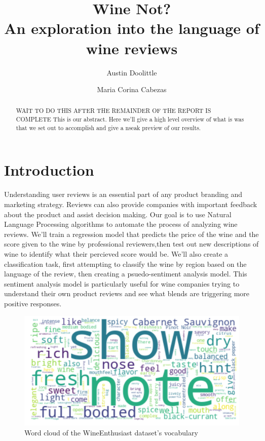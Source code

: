\documentclass[10pt]{IEEEtran}
\title{
    Wine Not? \\
    \large An exploration into the language of wine reviews
}
\author[1]{Austin Doolittle}
\author[1]{Maria Corina Cabezas}
\affil[1]{
    University of California, Berkeley
    \authorcr{\tt \{austin.doolittle, m.cabezas95\}@berkeley.edu}\vspace{1.5ex}
}
\begin{document}
\maketitle
\begin{abstract}
    WAIT TO DO THIS AFTER THE REMAINDER OF THE REPORT IS COMPLETE
    This is our abstract. Here we'll give a high level overview of what is was that we set out to accomplish and give a nseak preview of our results.
\end{abstract}

\section{Introduction}
    Understanding user reviews is an essential part of any product branding and marketing strategy. Reviews can also provide companies with important feedback about the product and assist decision making. Our goal is to use Natural Language Processing algorithms to automate the process of analyzing wine reviews. We'll train a regression model that predicts the price of the wine and the score given to the wine by professional reviewers,then test out new descriptions of wine to identify what their percieved score would be. We'll also create a classification task, first attempting to classify the wine by region based on the language of the review, then creating a psuedo-sentiment analysis model. This sentiment analysis model is particularly useful for wine companies trying to understand their own product reviews and see what blends are triggering more positive responses. 

    \begin{figure}
        \centering
        \includegraphics[width=\columnwidth]{wordcloud}
        \caption{Word cloud of the WineEnthusiast dataset's vocabulary}
    \end{figure}
\end{document}
